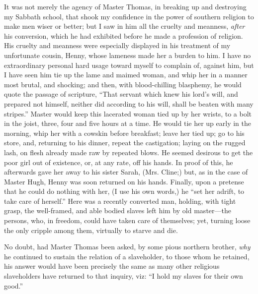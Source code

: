 It was not merely the agency of Master Thomas, in breaking up and
destroying my Sabbath school, that shook my confidence in the power of
southern religion to make men wiser or better; but I saw in him all the
cruelty and meanness, \emph{after} his conversion, {}which he had
exhibited before he made a profession of religion. His cruelty and
meanness were especially displayed in his treatment of my unfortunate
cousin, Henny, whose lameness made her a burden to him. I have no
extraordinary personal hard usage toward myself to complain of, against
him, but I have seen him tie up the lame and maimed woman, and whip her
in a manner most brutal, and shocking; and then, with blood-chilling
blasphemy, he would quote the passage of scripture, ``That servant which
knew his lord's will, and prepared not himself, neither did according to
his will, shall be beaten with many stripes.'' Master would keep this
lacerated woman tied up by her wrists, to a bolt in the joist, three,
four and five hours at a time. He would tie her up early in the morning,
whip her with a cowskin before breakfast; leave her tied up; go to his
store, and, returning to his dinner, repeat the castigation; laying on
the rugged lash, on flesh already made raw by repeated blows. He seemed
desirous to get the poor girl out of existence, or, at any rate, off his
hands. In proof of this, he afterwards gave her away to his sister
Sarah, (Mrs. Cline;) but, as in the case of Master Hugh, Henny was soon
returned on his hands. Finally, upon a pretense that he could do nothing
with her, (I use his own words,) he ``set her adrift, to take care of
herself.'' Here was a recently converted man, holding, with tight grasp,
the well-framed, and able bodied slaves left him by old master---the
persons, who, in freedom, could have taken care of themselves; yet,
turning loose the only cripple among them, virtually to starve and die.

{}No doubt, had Master Thomas been asked, by some pious northern
brother, \emph{why} he continued to sustain the relation of a
slaveholder, to those whom he retained, his answer would have been
precisely the same as many other religious slaveholders have returned to
that inquiry, viz: ``I hold my slaves for their own good.''

